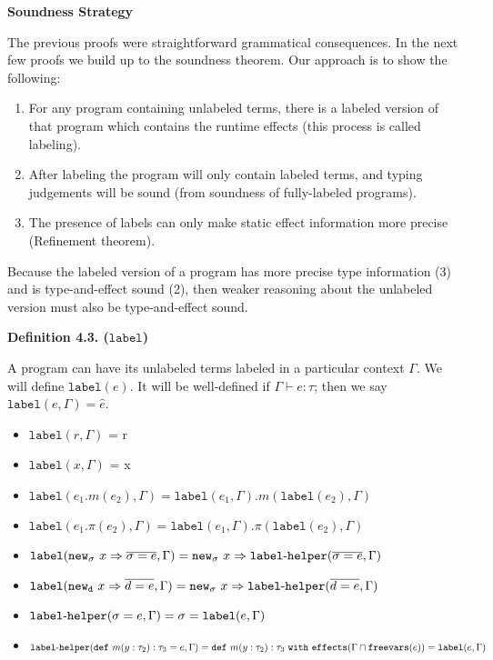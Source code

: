 \documentclass{llncs}
\newcommand{\keywadj}[1]{\mathtt{#1}}
\newcommand{\keyw}[1]{\keywadj{#1}~}
\newcommand{\kwa}[1]{\keywadj{ #1 }}
\newcommand{\hyphen}{\hbox{-}}
\begin{document}
\begin{large}
\bf{Soundness Strategy}
\end{large}

\noindent
The previous proofs were straightforward grammatical consequences. In the next few proofs we build up to the soundness theorem. Our approach is to show the following:
\begin{enumerate}
	\item For any program containing unlabeled terms, there is a labeled version of that program which contains the runtime effects (this process is called labeling).
	\item After labeling the program will only contain labeled terms, and typing judgements will be sound (from soundness of fully-labeled programs).
	\item The presence of labels can only make static effect information more precise (Refinement theorem).
\end{enumerate}

\noindent
Because the labeled version of a program has more precise type information (3) and is type-and-effect sound (2), then weaker reasoning about the unlabeled version must also be type-and-effect sound. \\
	

\begin{large}
\bf{Definition 4.3. ($\keywadj{label}$)}
\end{large}

\noindent
A program can have its unlabeled terms labeled in a particular context $\Gamma$. We will define $\kwa{label}(e)$. It will be well-defined if $\Gamma \vdash e : \tau$; then we say $\kwa{label}(e, \Gamma) = \hat e$.

\begin{itemize}
	\item $\keywadj{label}(r, \Gamma)$ = r
	\item $\keywadj{label}(x, \Gamma)$ = x
	\item $\keywadj{label}(e_1.m(e_2), \Gamma) = \keywadj{label}(e_1, \Gamma).m(\keywadj{label}(e_2), \Gamma)$
	\item $\keywadj{label}(e_1.\pi(e_2), \Gamma) = \keywadj{label}(e_1, \Gamma).\pi(\keywadj{label}(e_2), \Gamma)$
	\item $\keywadj{label}(\keyw{new_\sigma} x \Rightarrow \overline{\sigma = e}, \Gamma) = \keywadj{new}_\sigma~x \Rightarrow \keywadj{label \hyphen helper}(\overline{\sigma = e}, \Gamma)$
	\item $\keywadj{label}(\keyw{new_d} x \Rightarrow \overline{d = e}, \Gamma) = \keyw{new_\sigma} x \Rightarrow \keywadj{label \hyphen helper}(\overline{d = e}, \Gamma)$
	\item $\keywadj{label \hyphen helper}(\sigma = e, \Gamma) = \sigma = \keywadj{label}(e, \Gamma)$
	\item $\keywadj{label \hyphen helper}(\keywadj{def}~m(y : \tau_2) : \tau_3 = e, \Gamma) = \keywadj{def}~m(y : \tau_2) : \tau_3~\keyw{with} \keywadj{effects}(\Gamma \cap \keywadj{freevars}(e)) = \keywadj{label}(e, \Gamma)$
\end{itemize}
\end{document}
